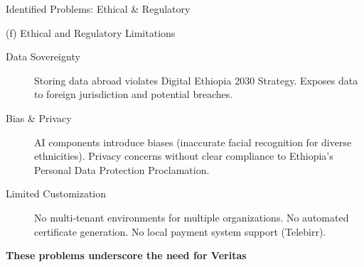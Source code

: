 \begin{frame}{Identified Problems: Ethical \& Regulatory}
    \begin{alertblock}{(f) Ethical and Regulatory Limitations}
        \begin{description}
            \item[Data Sovereignty] Storing data abroad violates Digital Ethiopia 2030 Strategy. Exposes data to foreign jurisdiction and potential breaches.
            
            \item[Bias \& Privacy] AI components introduce biases (inaccurate facial recognition for diverse ethnicities). Privacy concerns without clear compliance to Ethiopia's Personal Data Protection Proclamation.
            
            \item[Limited Customization] No multi-tenant environments for multiple organizations. No automated certificate generation. No local payment system support (Telebirr).
        \end{description}
    \end{alertblock}
    
    \vspace{0.5cm}
    \begin{center}
        \textbf{These problems underscore the need for Veritas}
    \end{center}
\end{frame}
